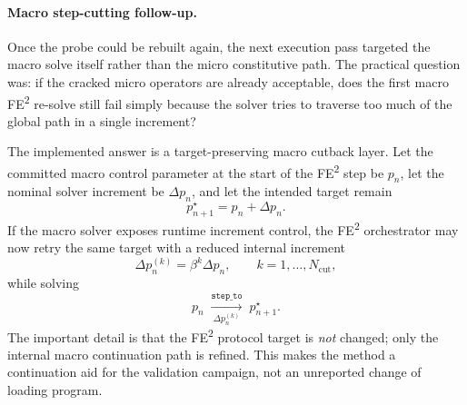 \paragraph{Macro step-cutting follow-up.}
Once the probe could be rebuilt again, the next execution pass targeted the
macro solve itself rather than the micro constitutive path.  The practical
question was: if the cracked micro operators are already acceptable, does the
first macro FE\textsuperscript{2} re-solve still fail simply because the
solver tries to traverse too much of the global path in a single increment?

The implemented answer is a target-preserving macro cutback layer.  Let the
committed macro control parameter at the start of the FE\textsuperscript{2}
step be \(p_n\), let the nominal solver increment be \(\Delta p_n\), and let
the intended target remain
\begin{equation}
  p_{n+1}^{\star} = p_n + \Delta p_n.
\end{equation}
If the macro solver exposes runtime increment control, the FE\textsuperscript{2}
orchestrator may now retry the same target with a reduced internal increment
\begin{equation}
  \Delta p_n^{(k)} = \beta^k \Delta p_n,
  \qquad
  k = 1,\dots,N_{\mathrm{cut}},
\end{equation}
while solving
\begin{equation}
  p_n \;\xrightarrow[\Delta p_n^{(k)}]{\texttt{step\_to}}\; p_{n+1}^{\star}.
\end{equation}
The important detail is that the FE\textsuperscript{2} protocol target is
\emph{not} changed; only the internal macro continuation path is refined.  This
makes the method a continuation aid for the validation campaign, not an
unreported change of loading program.

